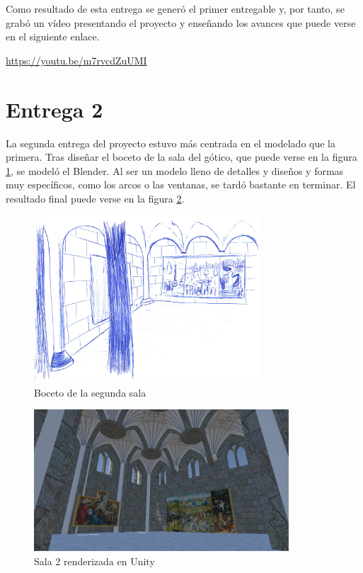 Como resultado de esta entrega se generó el primer entregable y, por tanto, se grabó un vídeo presentando el proyecto y enseñando los avances que puede verse en el siguiente enlace.

\begin{center}
    \url{https://youtu.be/m7rvcdZuUMI}
\end{center}



\section{Entrega 2}

La segunda entrega del proyecto estuvo más centrada en el modelado que la primera. Tras diseñar el boceto de la sala del gótico, que puede verse en la figura \ref{fig:bocetos-sala-2}, se modeló el Blender. Al ser un modelo lleno de detalles y diseños y formas muy específicos, como los arcos o las ventanas, se tardó bastante en terminar. El resultado final puede verse en la figura \ref{fig:unity-sala-2}.

\begin{figure}[!h]
\begin{center}
\includegraphics[width=0.75\textwidth]{imagenes/7/bocetos/boceto-sala-2.png}
\caption{Boceto de la segunda sala}
\label{fig:bocetos-sala-2}
\end{center}
\end{figure}

\begin{figure}[!h]
\begin{center}
\includegraphics[width=0.85\textwidth]{imagenes/7/salas-unity/unity-sala-2.png}
\caption{Sala 2 renderizada en Unity}
\label{fig:unity-sala-2}
\end{center}
\end{figure}

